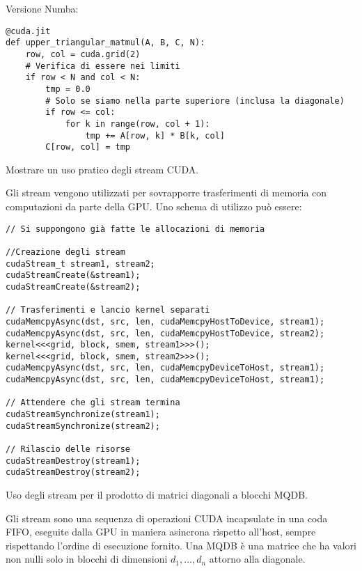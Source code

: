 \begin{questions}
\begin{solution}
        Versione Numba:
        \begin{verbatim}
@cuda.jit
def upper_triangular_matmul(A, B, C, N):
    row, col = cuda.grid(2)
    # Verifica di essere nei limiti
    if row < N and col < N:
        tmp = 0.0
        # Solo se siamo nella parte superiore (inclusa la diagonale)
        if row <= col:
            for k in range(row, col + 1):
                tmp += A[row, k] * B[k, col]
        C[row, col] = tmp
        \end{verbatim}
    \end{solution}
    
    \question Mostrare un uso pratico degli stream CUDA.
    
    \begin{solution}
        Gli stream vengono utilizzati per sovrapporre trasferimenti di memoria con computazioni da parte della GPU. Uno schema di utilizzo può essere: 
        \begin{verbatim}
// Si suppongono già fatte le allocazioni di memoria

//Creazione degli stream
cudaStream_t stream1, stream2;
cudaStreamCreate(&stream1);
cudaStreamCreate(&stream2);

// Trasferimenti e lancio kernel separati
cudaMemcpyAsync(dst, src, len, cudaMemcpyHostToDevice, stream1);
cudaMemcpyAsync(dst, src, len, cudaMemcpyHostToDevice, stream2);
kernel<<<grid, block, smem, stream1>>>();
kernel<<<grid, block, smem, stream2>>>();
cudaMemcpyAsync(dst, src, len, cudaMemcpyDeviceToHost, stream1);
cudaMemcpyAsync(dst, src, len, cudaMemcpyDeviceToHost, stream1);

// Attendere che gli stream termina
cudaStreamSynchronize(stream1);
cudaStreamSynchronize(stream2);

// Rilascio delle risorse
cudaStreamDestroy(stream1);
cudaStreamDestroy(stream2);
        \end{verbatim}
    \end{solution}
    
    \question Uso degli stream per il prodotto di matrici diagonali a blocchi MQDB.
    
    \begin{solution}
        Gli stream sono una sequenza di operazioni CUDA incapsulate in una coda FIFO, eseguite dalla GPU in maniera asincrona rispetto all'host, sempre rispettando l'ordine di esecuzione fornito. Una MQDB è una matrice che ha valori non nulli solo in blocchi di dimensioni $d_1, \dots, d_n$ attorno alla diagonale.
        

\end{solution}
\end{questions}
